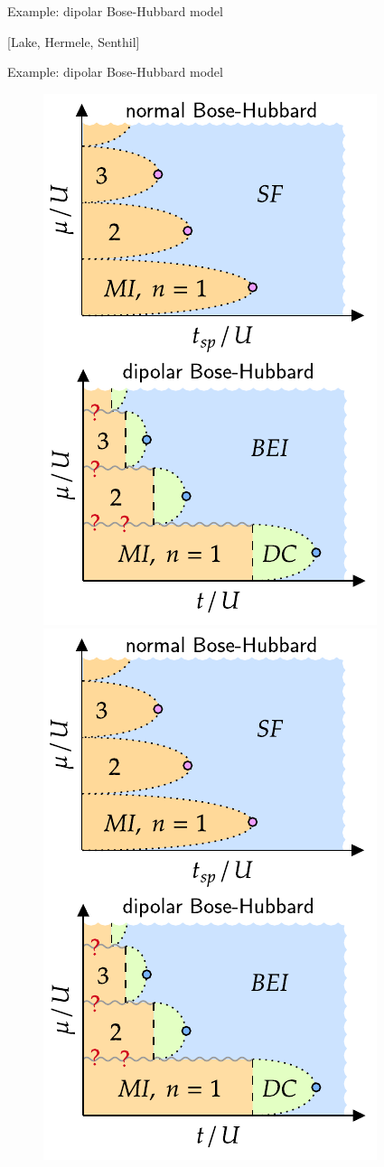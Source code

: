\documentclass{beamer}
\begin{document}
\begin{frame}{Example: dipolar Bose-Hubbard model}
\begin{figure}
\end{figure}
[Lake, Hermele, Senthil]
\end{frame}

\begin{frame}[t]{Example: dipolar Bose-Hubbard model}
\begin{figure}
	\centering
	\includegraphics[scale=.8]{bhm}
	\includegraphics[scale=.8]{dbhm}

\end{figure}
\end{frame}
\end{document}
